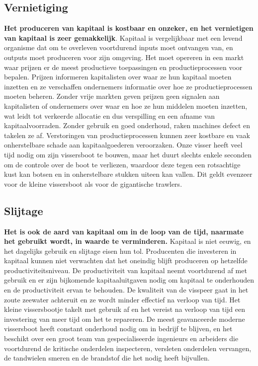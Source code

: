 \documentclass[
  a5paper,
  smalldemyvopaper,11pt,twoside,onecolumn,openright,extrafontsizes,
hidelinks]{memoir}
\begin{document}
\subsection{Vernietiging}\label{vernietiging}

\textbf{Het produceren van kapitaal is kostbaar en onzeker, en het
vernietigen van kapitaal is zeer gemakkelijk}. Kapitaal is vergelijkbaar
met een levend organisme dat om te overleven voortdurend inputs moet
ontvangen van, en outputs moet produceren voor zijn omgeving. Het moet
opereren in een markt waar prijzen er de meest productieve toepassingen
en productieprocessen voor bepalen. Prijzen informeren kapitalisten over
waar ze hun kapitaal moeten inzetten en ze verschaffen ondernemers
informatie over hoe ze productieprocessen moeten beheren. Zonder vrije
markten geven prijzen geen signalen aan kapitalisten of ondernemers over
waar en hoe ze hun middelen moeten inzetten, wat leidt tot verkeerde
allocatie en dus verspilling en een afname van kapitaalvoorraden. Zonder
gebruik en goed onderhoud, raken machines defect en takelen ze af.
Verstoringen van productieprocessen kunnen zeer kostbare en vaak
onherstelbare schade aan kapitaalgoederen veroorzaken. Onze visser heeft
veel tijd nodig om zijn vissersboot te bouwen, maar het duurt slechts
enkele seconden om de controle over de boot te verliezen, waardoor deze
tegen een rotsachtige kust kan botsen en in onherstelbare stukken uiteen
kan vallen. Dit geldt evenzeer voor de kleine vissersboot als voor de
gigantische trawlers.

\subsection{Slijtage}\label{slijtage}

\textbf{Het is ook de aard van kapitaal om in de loop van de tijd,
naarmate het gebruikt wordt, in waarde te verminderen.} Kapitaal is niet
eeuwig, en het dagelijks gebruik en slijtage eisen hun tol. Producenten
die investeren in kapitaal kunnen niet verwachten dat het oneindig
blijft produceren op hetzelfde productiviteitsniveau. De productiviteit
van kapitaal neemt voortdurend af met gebruik en er zijn bijkomende
kapitaaluitgaven nodig om kapitaal te onderhouden en de productiviteit
ervan te behouden. De kwaliteit van de visspeer gaat in het zoute
zeewater achteruit en ze wordt minder effectief na verloop van tijd. Het
kleine vissersbootje takelt met gebruik af en het vereist na verloop van
tijd een investering van meer tijd om het te repareren. De meest
geavanceerde moderne vissersboot heeft constant onderhoud nodig om in
bedrijf te blijven, en het beschikt over een groot team van
gespecialiseerde ingenieurs en arbeiders die voortdurend de kritische
onderdelen inspecteren, versleten onderdelen vervangen, de tandwielen
smeren en de brandstof die het nodig heeft bijvullen.
\end{document}
